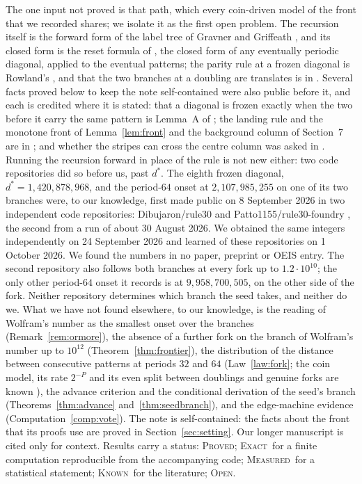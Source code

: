 \documentclass[11pt]{article}
\theoremstyle{definition}
\theoremstyle{remark}
\newcommand{\PROVED}{\textsc{Proved}}
\newcommand{\EXACT}{\textsc{Exact}}
\newcommand{\MEASURED}{\textsc{Measured}}
\newcommand{\KNOWN}{\textsc{Known}}
\newcommand{\OPEN}{\textsc{Open}}
\newcommand{\dstar}{d^{*}}
\begin{document}
The one input not proved is that path, which every coin-driven model of the front that we recorded shares; we isolate it as the first open problem. The recursion itself is the forward form of the label tree of Gravner and Griffeath \cite{GG}, and its closed form is the reset formula of \cite{B}, the closed form of any eventually periodic diagonal, applied to the eventual patterns; the parity rule at a frozen diagonal is Rowland's \cite{Rowland}, and that the two branches at a doubling are translates is in \cite[\S8]{GG}. Several facts proved below to keep the note self-contained were also public before it, and each is credited where it is stated: that a diagonal is frozen exactly when the two before it carry the same pattern is Lemma~A of \cite{Pat2}; the landing rule and the monotone front of Lemma~\ref{lem:front} and the background column of Section~7 are in \cite{Dib2}; and whether the stripes can cross the centre column was asked in \cite{Wolfram}. Running the recursion forward in place of the rule is not new either: two code repositories did so before us, past $\dstar$. The eighth frozen diagonal, $\dstar=1{,}420{,}878{,}968$, and the period-$64$ onset at $2{,}107{,}985{,}255$ on one of its two branches were, to our knowledge, first made public on 8 September 2026 in two independent code repositories: Dibujaron/rule30 \cite{Dib} and Patto1155/rule30-foundry \cite{Pat}, the second from a run of about 30 August 2026. We obtained the same integers independently on 24 September 2026 and learned of these repositories on 1 October 2026. We found the numbers in no paper, preprint or OEIS entry. The second repository also follows both branches at every fork up to $1.2\cdot10^{10}$; the only other period-$64$ onset it records is at $9{,}958{,}700{,}505$, on the other side of the fork. Neither repository determines which branch the seed takes, and neither do we. What we have not found elsewhere, to our knowledge, is the reading of Wolfram's number as the smallest onset over the branches (Remark~\ref{rem:ormore}), the absence of a further fork on the branch of Wolfram's number up to $10^{12}$ (Theorem~\ref{thm:frontier}), the distribution of the distance between consecutive patterns at periods $32$ and $64$ (Law~\ref{law:fork}; the coin model, its rate $2^{-P}$ and its even split between doublings and genuine forks are known \cite{Dib2,GG,Pat2,W86}), the advance criterion and the conditional derivation of the seed's branch (Theorems~\ref{thm:advance} and~\ref{thm:seedbranch}), and the edge-machine evidence (Computation~\ref{comp:vote}). The note is self-contained: the facts about the front that its proofs use are proved in Section~\ref{sec:setting}. Our longer manuscript \cite{B} is cited only for context. Results carry a status: \PROVED; \EXACT\ for a finite computation reproducible from the accompanying code; \MEASURED\ for a statistical statement; \KNOWN\ for the literature; \OPEN.
\end{document}
